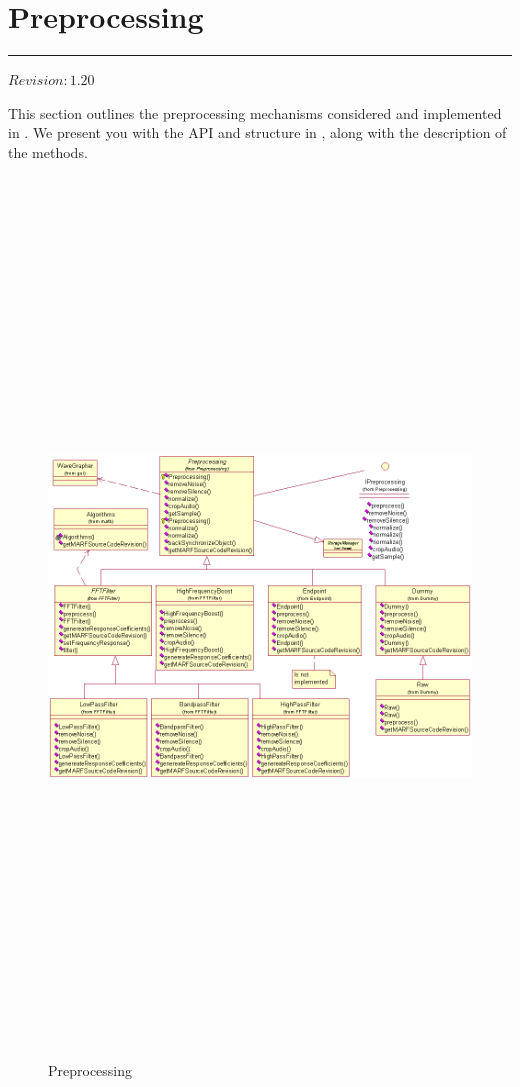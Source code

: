 \section{Preprocessing}
\label{sect:preprocessing}

\noindent
\rule{7.0in}{.013in}

$Revision: 1.20 $

This section outlines the preprocessing mechanisms considered
and implemented in {\marf}. We present you with the API and structure in , along with
the description of the methods.

\begin{figure}
	\centering
	\includegraphics[angle=90,height=660pt]{../graphics/arch/preprocessing.png}
	\caption{Preprocessing}
	\label{fig:preprocessing}
\end{figure}

